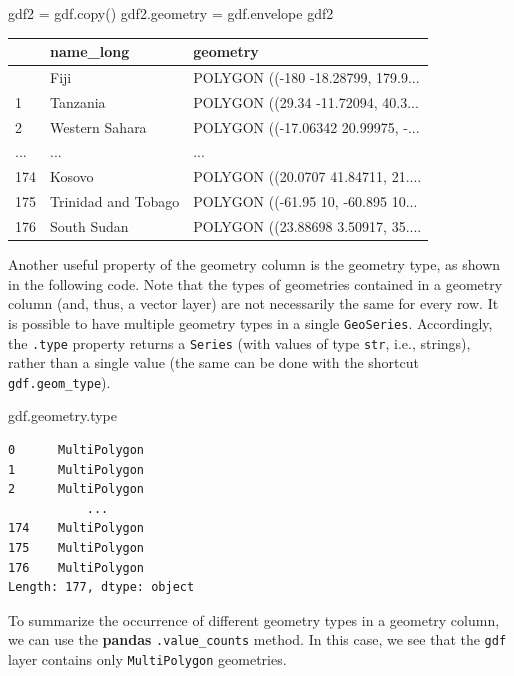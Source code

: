 \documentclass[
  letterpaper,
]{krantz}
\newenvironment{Shaded}{\begin{snugshade}}{\end{snugshade}}
\newcommand{\BuiltInTok}[1]{\textcolor[rgb]{0.00,0.23,0.31}{#1}}
\newcommand{\NormalTok}[1]{\textcolor[rgb]{0.00,0.23,0.31}{#1}}
\newcommand{\OperatorTok}[1]{\textcolor[rgb]{0.37,0.37,0.37}{#1}}
\begin{document}
\begin{Shaded}
\begin{Highlighting}[]
\NormalTok{gdf2 }\OperatorTok{=}\NormalTok{ gdf.copy()}
\NormalTok{gdf2.geometry }\OperatorTok{=}\NormalTok{ gdf.envelope}
\NormalTok{gdf2}
\end{Highlighting}
\end{Shaded}

\begin{longtable}[]{@{}lll@{}}
\toprule\noalign{}
& name\_long & geometry \\
\midrule\noalign{}
\endhead
\bottomrule\noalign{}
\endlastfoot
0 & Fiji & POLYGON ((-180 -18.28799, 179.9... \\
1 & Tanzania & POLYGON ((29.34 -11.72094, 40.3... \\
2 & Western Sahara & POLYGON ((-17.06342 20.99975, -... \\
... & ... & ... \\
174 & Kosovo & POLYGON ((20.0707 41.84711, 21.... \\
175 & Trinidad and Tobago & POLYGON ((-61.95 10, -60.895 10... \\
176 & South Sudan & POLYGON ((23.88698 3.50917, 35.... \\
\end{longtable}

Another useful property of the geometry column is the geometry type, as
shown in the following code. Note that the types of geometries contained
in a geometry column (and, thus, a vector layer) are not necessarily the
same for every row. It is possible to have multiple geometry types in a
single \texttt{GeoSeries}. Accordingly, the \texttt{.type} property
returns a \texttt{Series} (with values of type \texttt{str}, i.e.,
strings), rather than a single value (the same can be done with the
shortcut \texttt{gdf.geom\_type}).

\begin{Shaded}
\begin{Highlighting}[]
\NormalTok{gdf.geometry.}\BuiltInTok{type}
\end{Highlighting}
\end{Shaded}

\begin{verbatim}
0      MultiPolygon
1      MultiPolygon
2      MultiPolygon
           ...     
174    MultiPolygon
175    MultiPolygon
176    MultiPolygon
Length: 177, dtype: object
\end{verbatim}

To summarize the occurrence of different geometry types in a geometry
column, we can use the \textbf{pandas} \texttt{.value\_counts} method.
In this case, we see that the \texttt{gdf} layer contains only
\texttt{\textquotesingle{}MultiPolygon\textquotesingle{}} geometries.
\end{document}
